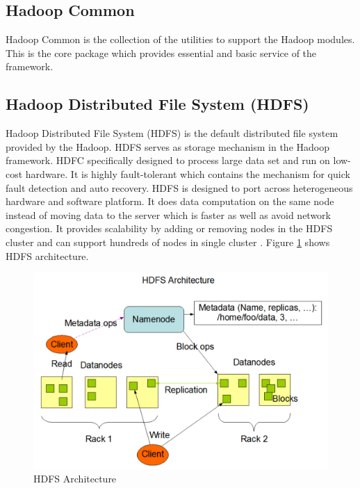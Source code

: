 \documentclass[sigconf]{acmart}
\begin{document}
\subsection{Hadoop Common}
Hadoop Common is the collection of the utilities to support the Hadoop modules. This is the core package which provides essential and basic service of the framework.

\subsection{Hadoop Distributed File System (HDFS)}
Hadoop Distributed File System (HDFS) is the default distributed file system provided by the Hadoop. HDFS serves as storage mechanism in the Hadoop framework. HDFC specifically designed to process large data set and run on low-cost hardware. It is highly fault-tolerant which contains the mechanism for quick fault detection and auto recovery. HDFS is designed to port across heterogeneous hardware and software platform. It does data computation on the same node instead of moving data to the server which is faster as well as avoid network congestion. It provides scalability by adding or removing nodes in the HDFS cluster and can support hundreds of nodes in single cluster \cite{www-hdfs-arch}. Figure \ref{f:hdfs-arch} shows HDFS architecture.
\begin{figure}[!ht]
  \centering\includegraphics[width=\columnwidth]{images/hdfsArch.PNG}
  \caption{HDFS Architecture \cite{www-hdfs-arch}}\label{f:hdfs-arch}
\end{figure}
\end{document}
